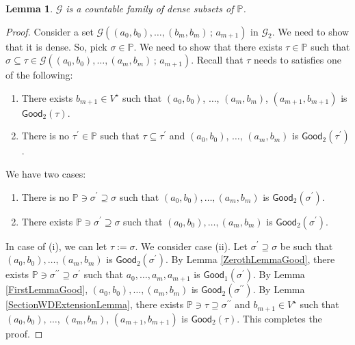 \documentclass[10pt,a4paper, openany,  oldfontcommands]{memoir}
\newtheorem{lemma} [theorem] {Lemma}
\newtheorem{open problem} [theorem] {Open Problem}
\begin{document}
\begin{lemma}
$  \mathcal{G} $ is a countable family of dense subsets of  $  \mathbb{P} $.
\end{lemma}
\begin{proof}

Consider a set    $  \mathcal{G}    \left(    (a_0,  b_0 ) ,  \ldots , (b_m , b_m ) \,  ;   \,   a_{ m+1}   \right) $ in $  \mathcal{G}_2 $. 
We need to show that it is dense. 
So, pick $   \sigma  \in   \mathbb{P} $. 
We  need to show that there exists  $  \tau  \in  \mathbb{P} $  such that 
  $   \sigma  \subseteq  \tau   \in   \mathcal{G}   \left(    (a_0,  b_0 ) ,  \ldots , (a_m , b_m ) \,  ;   \,   a_{ m+1}   \right) $.
Recall that $  \tau $ needs to satisfies one of the following: 
   \begin{enumerate}
\item   There exists     $  b_{  m+1 }   \in   V^{  \star }  $ such that   
$  (a_0,  b_0 ) $,  $\ldots $,   $(a_m , b_m )  $,      $ (a_{ m+1 } ,  b_{ m+1 } ) $  is  $ \mathsf{Good}_2 \left(   \tau  \right)   $.


\item There is no   $  \tau^{  \prime  }    \in  \mathbb{P}   $  such that 
$  \tau  \subseteq   \tau^{  \prime  }   $   and 
  $  (a_0,  b_0 )   $,   $\ldots   $,  $ (a_m , b_m ) $  is  $ \mathsf{Good}_2  \left(   \tau^{  \prime  }    \right)   $.
 \end{enumerate} 
We have two cases: 
\begin{enumerate}
\item[\textup{(i)}] There is no   $ \mathbb{P}   \ni \sigma^{  \prime } \supseteq  \sigma $  such that 
  $  (a_0,  b_0 ) ,  \ldots , (a_m , b_m ) $  is  $ \mathsf{Good}_2  \left(   \sigma^{  \prime }  \right)   $.
  
   
\item[\textup{(ii)}]  There exists    $   \mathbb{P}   \ni    \sigma^{  \prime } \supseteq  \sigma $  such that 
  $  (a_0,  b_0 ) ,  \ldots , (a_m , b_m ) $  is  $ \mathsf{Good}_2 \left(   \sigma^{  \prime }  \right)   $. 
  \end{enumerate}
In case of (i), we can let  $  \tau :=  \sigma $. 
We consider case (ii). 
Let     $ \sigma^{  \prime } \supseteq  \sigma $  be such that 
  $  (a_0,  b_0 ) ,  \ldots , (a_m , b_m ) $  is  $ \mathsf{Good}_2  \left(   \sigma^{  \prime }  \right)   $.
  By Lemma    \ref{ZerothLemmaGood}, 
  there exists  $ \mathbb{P} \ni     \sigma^{  \prime  \prime }   \supseteq   \sigma^{  \prime }  $  such that  
  $  a_0,  \ldots , a_m , a_{ m+1}  $  is  $ \mathsf{Good}_1  \left(   \sigma^{  \prime } \right)   $. 
  By Lemma  \ref{FirstLemmaGood}, 
    $  (a_0,  b_0 ) ,  \ldots , (a_m , b_m ) $  is  $ \mathsf{Good}_2  \left(   \sigma^{  \prime  \prime }  \right)   $.
   By Lemma     \ref{SectionWDExtensionLemma}, 
there exists   $  \mathbb{P} \ni   \tau \supseteq  \sigma^{  \prime  \prime  }   $  and  $  b_{  m+1}  \in V^{  \star }  $  such that 
$  (a_0,  b_0 )  $,    $   \ldots   $,    $ (a_m,  b_m )  $,    $ (a_{ m+1 } ,  b_{ m+1 } ) $  is  $ \mathsf{Good}_2 \left(   \tau  \right)   $. 
This completes the proof.
\end{proof}
\end{document}
